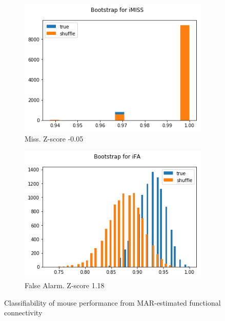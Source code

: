 \documentclass[a4paper,10pt]{article}
\begin{document}
\begin{figure}
    \begin{subfigure}[b]{0.4\textwidth}
        \includegraphics[width=\textwidth]{img/marN_penny_noinput_A1_classifiability_miss.png}
        \caption{Miss. Z-score -0.05}
        \label{fig:marN_penny_noinput_A1_classifiability_miss}
    \end{subfigure}\hspace{0.05\textwidth}
    \begin{subfigure}[b]{0.4\textwidth}
        \includegraphics[width=\textwidth]{img/marN_penny_noinput_A1_classifiability_fa.png}
        \caption{False Alarm. Z-score 1.18}
        \label{fig:marN_penny_noinput_A1_classifiability_fa}
    \end{subfigure}
    \caption{Classifiability of mouse performance from MAR-estimated functional connectivity}\label{fig:marN_penny_noinput_A1_classifiability}
\end{figure}
\end{document}
